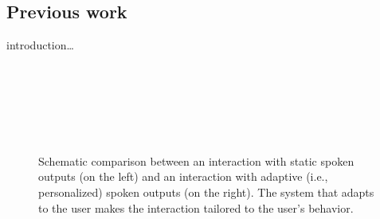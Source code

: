 \subsection{Previous work}
\label{subsec:previous_work}


introduction\ldots

\citet{Weise2018looking}\\%
\citet{Lewandowski2019phonetic}\\%
\citet{Xiao2015analyzing}\\%
\citet{Cohen2017converging}\\%
\citet{DeLooze2014investigating}\\%
\citet{Lopes2013lexical} %

\begin{figure}[t]
	\centering
	\hfill %
	\caption[Static vs.\ adaptive speech output]
		{Schematic comparison between an interaction with static spoken outputs (on the left) and an interaction with adaptive (i.e., personalized) spoken outputs (on the right).
		The system that adapts to the user makes the interaction tailored to the user's behavior.}
	\label{fig:static_vs_adaptive_speech_output}
\end{figure}


